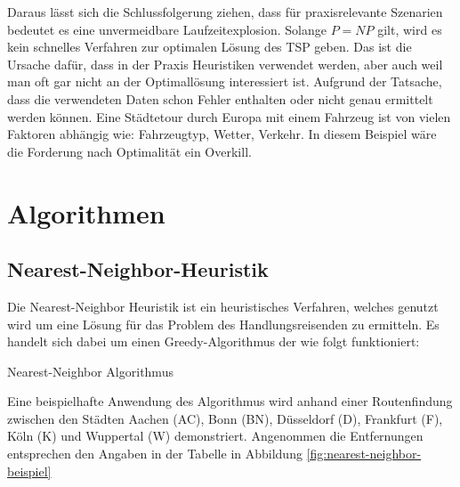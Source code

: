 \documentclass{article}
\begin{document}
Daraus lässt sich die Schlussfolgerung ziehen, dass für praxisrelevante Szenarien bedeutet es eine unvermeidbare Laufzeitexplosion. Solange $P = NP$ gilt, wird es kein schnelles Verfahren zur optimalen Lösung des TSP geben. Das ist die Ursache dafür, dass in der Praxis Heuristiken verwendet werden, aber auch weil man oft gar nicht an der Optimallösung interessiert ist. Aufgrund der Tatsache, dass die verwendeten Daten schon Fehler enthalten oder nicht genau ermittelt werden können. Eine Städtetour durch Europa mit einem Fahrzeug ist von vielen Faktoren abhängig wie: Fahrzeugtyp, Wetter, Verkehr. In diesem Beispiel wäre die Forderung nach Optimalität ein Overkill.


%
%
%
\newpage
\section{Algorithmen}

\subsection{Nearest-Neighbor-Heuristik}

Die Nearest-Neighbor Heuristik ist ein heuristisches Verfahren, welches genutzt wird um eine Lösung für das Problem des Handlungsreisenden zu ermitteln. Es handelt sich dabei um einen Greedy-Algorithmus der wie folgt funktioniert:

\begin{algorithm}
\caption{Nearest-Neighbor Algorithmus}
\end{algorithm}

Eine beispielhafte Anwendung des Algorithmus wird anhand einer Routenfindung zwischen den Städten Aachen (AC), Bonn (BN), Düsseldorf (D), Frankfurt (F), Köln (K) und Wuppertal (W) demonstriert. Angenommen die Entfernungen entsprechen den Angaben in der Tabelle in Abbildung \ref{fig:nearest-neighbor-beispiel}
\end{document}
